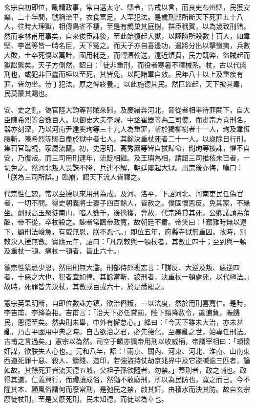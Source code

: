 \begin{pinyinscope}
 玄宗自初即位，勵精政事，常自選太守、縣令，告戒以言，而良吏布州縣，民獲安樂，二十年間，號稱治平，衣食富足，人罕犯法。是歲刑部所斷天下死罪五十八人，往時大理獄，相傳鳥雀不棲，至是有鵲巢其庭樹，群臣稱賀，以為幾致刑錯。然而李林甫用事矣，自來俊臣誅後，至此始復起大獄，以誣陷所殺數十百人，如韋堅、李邕等皆一時名臣，天下冤之。而天子亦自喜邊功，遣將分出以擊蠻夷，兵數大敗，士卒死傷以萬計，國用耗乏，而轉漕輸送，遠近煩費，民力既弊，盜賊起而獄訟繁矣。天子方側然，詔曰：「徒非重刑，而役者寒暑不釋械系。杖，古以代肉刑也，或犯非巨蠹而棰以至死，其皆免，以配諸軍自效。民年八十以上及重疾有罪，皆勿坐。侍丁犯法，原之俾終養。」以此施德其民。然巨盜起，天下被其毒，民莫蒙其賜也。



 安、史之亂，偽官陸大鈞等背賊來歸，及慶緒奔河北，脅從者相率待罪闕下，自大臣陳希烈等合數百人。以御史大夫李峴、中丞崔器等為三司使，而肅宗方喜刑名，器亦刻深，乃以河南尹達奚珣等三十九人為重罪，斬於獨柳樹者十一人，珣及韋恆腰斬，陳希烈等賜自盡於獄中者七人，其餘決重杖死者二十一人。以歲除日行刑，集百官臨視，家屬流竄。初，史思明、高秀巖等皆自拔歸命，聞珣等被誅，懼不自安，乃復叛。而三司用刑連年，流貶相繼。及王璵為相，請詔三司推核未已者，一切免之。然河北叛人畏誅不降，兵連不解，朝廷屢起大獄。肅宗後亦悔，嘆曰：「朕為三司所誤。」臨崩，詔天下流人皆釋之。



 代宗性仁恕，常以至德以來用刑為戒。及河、洛平，下詔河北、河南吏民任偽官者，一切不問。得史朝義將士妻子四百餘人，皆赦之。僕固懷恩反，免其家，不緣坐。劇賊高玉聚徒南山，啗人數千，後擒獲，會赦，代宗將貸其死，公卿議請為菹醢，帝不從，卒杖殺之。諫者常諷帝政寬，故朝廷不肅。帝笑曰：「艱難時無以逮下，顧刑法峻急，有威無恩，朕不忍也。」即位五年，府縣寺獄無重囚。故時，別敕決人捶無數。寶應元年，詔曰：「凡制敕與一頓杖者，其數止四十；至到與一頓及重杖一頓、痛杖一頓者，皆止六十。」



 德宗性猜忌少恩，然用刑無大濫。刑部侍郎班宏言：「謀反、大逆及叛、惡逆四者，十惡之大也，犯者宜如律。其餘當斬、絞刑者，決重杖一頓處死，以代極法。」故時，死罪皆先決杖，其數或百或六十，於是悉罷之。



 憲宗英果明斷，自即位數誅方鎮，欲治僭叛，一以法度，然於用刑喜寬仁。是時，李吉甫、李絳為相。吉甫言：「治天下必任賞罰，陛下頻降赦令，蠲逋負，賑饑民，恩德至矣。然典刑未舉，中外有懈怠心。」絳曰：「今天下雖未大治，亦未甚亂，乃古平國用中典之時。自古欲治之君，必先德化，至暴亂之世，始專任刑法。吉甫之言過矣。」憲宗以為然。司空于頔亦諷帝用刑以收威柄，帝謂宰相曰：「頔懷奸謀，欲朕失人心也。」元和八年，詔：「兩京、關內、河東、河北、淮南、山南東西道死罪十惡、殺人、鑄錢、造印，若強盜持仗劫京兆界中及它盜贓逾三匹者，論如故。其餘死罪皆流天德五城，父祖子孫欲隨者，勿禁。」蓋刑者，政之輔也。政得其道，仁義興行，而禮讓成俗，然猶不敢廢刑，所以為民防也，寬之而已。今不隆其本、顧風俗謂何而廢常刑，是弛民之禁，啟其奸，由積水而決其防。故自玄宗廢徒杖刑，至是又廢死刑，民未知德，而徒以為幸也。




\end{pinyinscope}
